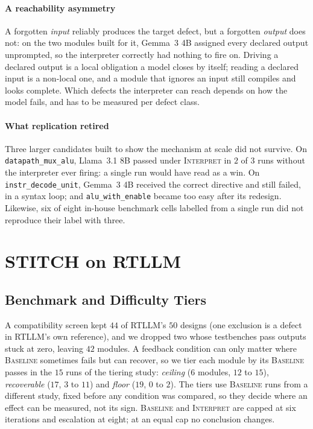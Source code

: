 \documentclass[11pt]{article}
\newcommand{\cname}[1]{\textsc{#1}}
\newcommand{\Base}{\cname{Baseline}}
\newcommand{\Interp}{\cname{Interpret}}
\begin{document}
\paragraph{A reachability asymmetry} A forgotten \emph{input} reliably produces
the target defect, but a forgotten \emph{output} does not: on the two modules
built for it, Gemma~3 4B assigned every declared output unprompted, so the
interpreter correctly had nothing to fire on. Driving a declared output is a
local obligation a model closes by itself; reading a declared input is a
non-local one, and a module that ignores an input still compiles and looks
complete. Which defects the interpreter can reach depends on how the model
fails, and has to be measured per defect class.

\paragraph{What replication retired} Three larger candidates built to show the
mechanism at scale did not survive. On \texttt{datapath\_mux\_alu}, Llama~3.1 8B
passed under \Interp{} in $2$ of $3$ runs without the interpreter ever firing: a
single run would have read as a win. On \texttt{instr\_decode\_unit}, Gemma~3 4B
received the correct directive and still failed, in a syntax loop; and
\texttt{alu\_with\_enable} became too easy after its redesign. Likewise, six of
eight in-house benchmark cells labelled from a single run did not reproduce
their label with three.

\section{STITCH on RTLLM}
\label{sec:rtllm}

\subsection{Benchmark and Difficulty Tiers}
\label{sec:tiers}

A compatibility screen kept $44$ of RTLLM's $50$ designs (one exclusion is a
defect in RTLLM's own reference), and we dropped two whose testbenches pass
outputs stuck at zero, leaving $42$ modules. A feedback condition can only
matter where \Base{} sometimes fails but can recover, so we tier each module by
its \Base{} passes in the $15$ runs of the tiering study:
\emph{ceiling} ($6$ modules, $12$ to $15$), \emph{recoverable} ($17$, $3$ to
$11$) and \emph{floor} ($19$, $0$ to $2$). The tiers use \Base{} runs from a different study, fixed
before any condition was compared, so they decide where an effect can be
measured, not its sign. \Base{} and \Interp{} are capped at six iterations and
escalation at eight; at an equal cap no conclusion changes.
\end{document}
